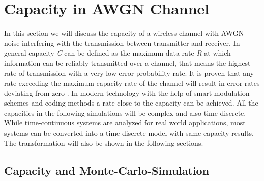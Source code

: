 \chapter{Capacity in AWGN Channel} \label{chap:awgnchan}
\graphicspath{{C:/Users/Kevin/Bachelarbeit/Bachelorarbeit/01_Bachelorarbeit_LaTex/02_Figures/}}

In this section we will discuss the capacity of a wireless channel with \gls{AWGN} noise interfering with the transmission between transmitter and receiver. 
\newline
In general capacity \textit{C} can be defined as the maximum data rate \textit{R} at which information can be reliably transmitted over a channel, that means the highest rate of transmission with a very low error probability rate. It is proven that any rate exceeding the maximum capacity rate of the channel will result in error rates deviating from zero \cite{Shannon}. In modern technology with the help of smart modulation schemes and coding methods a rate close to the capacity can be achieved. 
All the capacities in the following simulations will be complex and also time-discrete. While time-continuous systems are analyzed for real world applications, most systems can be converted into a time-discrete model with same capacity results. The transformation will also be shown in the following sections. 
\section{Capacity and Monte-Carlo-Simulation}
\label{sec:capAWGN}

